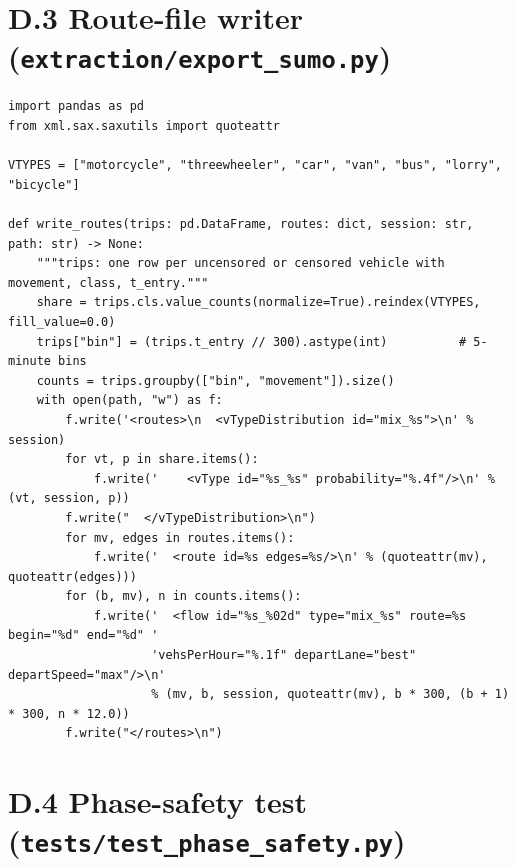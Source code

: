 \section*{D.3 Route-file writer (\texttt{extraction/export\_sumo.py})}

\begin{lstlisting}[style=py,caption={Writing the \dtx{} demand as a \sumo{} route file},label={lst:app-export}]
import pandas as pd
from xml.sax.saxutils import quoteattr

VTYPES = ["motorcycle", "threewheeler", "car", "van", "bus", "lorry", "bicycle"]

def write_routes(trips: pd.DataFrame, routes: dict, session: str, path: str) -> None:
    """trips: one row per uncensored or censored vehicle with movement, class, t_entry."""
    share = trips.cls.value_counts(normalize=True).reindex(VTYPES, fill_value=0.0)
    trips["bin"] = (trips.t_entry // 300).astype(int)          # 5-minute bins
    counts = trips.groupby(["bin", "movement"]).size()
    with open(path, "w") as f:
        f.write('<routes>\n  <vTypeDistribution id="mix_%s">\n' % session)
        for vt, p in share.items():
            f.write('    <vType id="%s_%s" probability="%.4f"/>\n' % (vt, session, p))
        f.write("  </vTypeDistribution>\n")
        for mv, edges in routes.items():
            f.write('  <route id=%s edges=%s/>\n' % (quoteattr(mv), quoteattr(edges)))
        for (b, mv), n in counts.items():
            f.write('  <flow id="%s_%02d" type="mix_%s" route=%s begin="%d" end="%d" '
                    'vehsPerHour="%.1f" departLane="best" departSpeed="max"/>\n'
                    % (mv, b, session, quoteattr(mv), b * 300, (b + 1) * 300, n * 12.0))
        f.write("</routes>\n")
\end{lstlisting}

\section*{D.4 Phase-safety test (\texttt{tests/test\_phase\_safety.py})}


